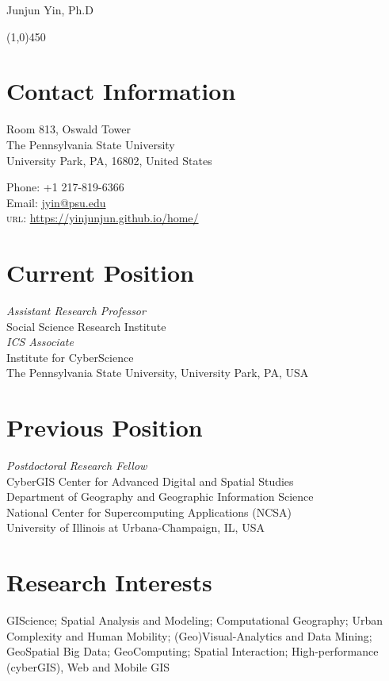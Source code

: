 \documentclass[11pt, a4paper]{article}
\begin{document}
{\LARGE Junjun Yin, Ph.D}
\begin{center}
\line(1,0){450}
\end{center}
\section*{Contact Information}

\begin{multicols}{2}
 \begin{flushleft}
Room 813, Oswald Tower\\
The Pennsylvania State University\\
University Park, PA, 16802, United States
\end{flushleft}
\columnbreak
\begin{flushright}
Phone: +1 217-819-6366\\[.1cm]
Email: \href{mailto:a.jyin@psu.edu}{jyin@psu.edu}\\[.1cm]
\textsc{url}: \href{https://yinjunjun.github.io/home/}{https://yinjunjun.github.io/home/}
\end{flushright}
\end{multicols}

\section*{Current Position}
\emph{Assistant Research Professor}\\
Social Science Research Institute\\

\emph{ICS Associate}\\
Institute for CyberScience\\
The Pennsylvania State University, University Park, PA, USA
\section*{Previous Position}
\emph{Postdoctoral Research Fellow}\\
CyberGIS Center for Advanced Digital and Spatial Studies\\
Department of Geography and Geographic Information Science\\
National Center for Supercomputing Applications (NCSA)\\
University of Illinois at Urbana-Champaign, IL, USA
\section*{Research Interests}
GIScience; Spatial Analysis and Modeling; Computational Geography;
Urban Complexity and Human Mobility; (Geo)Visual-Analytics and Data Mining; 
GeoSpatial Big Data; GeoComputing; Spatial Interaction; High-performance (cyberGIS), Web and Mobile GIS
\end{document}
